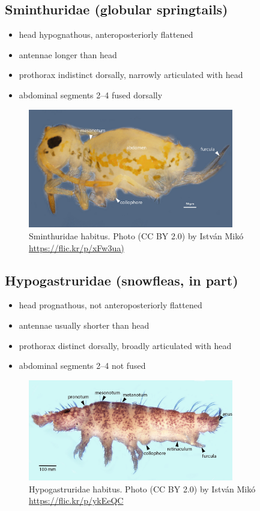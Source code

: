 \documentclass[letterpaper, 11pt]{article}
\begin{document}
\subsection{Sminthuridae (globular springtails)}
\begin{itemize}
\item head hypognathous, anteroposteriorly flattened
\item antennae longer than head
\item prothorax indistinct dorsally, narrowly articulated with head
\item abdominal segments 2--4 fused dorsally
\end{itemize}

\begin{figure}[ht!]
  \centering
    \includegraphics[width=0.8\textwidth]{sminthBody}
  \caption{Sminthuridae habitus. Photo (CC BY 2.0) by Istv\'an Mik\'o \url{https://flic.kr/p/xFw3ua)}}
  \label{fig:sminthhab}
\end{figure}

\subsection{Hypogastruridae (snowfleas, in part)}
\begin{itemize}
\item head prognathous, not anteroposteriorly flattened
\item antennae usually shorter than head
\item prothorax distinct dorsally, broadly articulated with head
\item abdominal segments 2--4 not fused
\end{itemize}

\begin{figure}[ht!]
  \centering
    \includegraphics[width=0.8\textwidth]{hypogastrurid1}
  \caption{Hypogastruridae habitus. Photo (CC BY 2.0) by Istv\'an Mik\'o \url{https://flic.kr/p/ykEeQC}}
  \label{fig:hypogasthab}
\end{figure}
\end{document}
